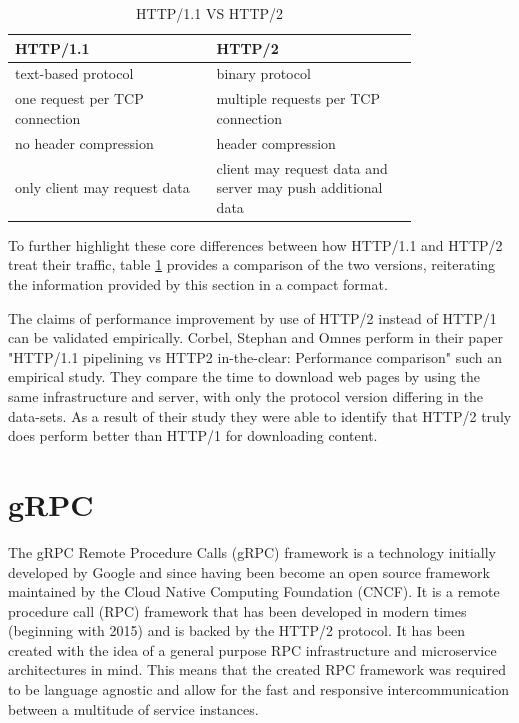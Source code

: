 \documentclass[conference]{IEEEtran}
\begin{document}
\begin{table}[!htbp]
	\centering
	\caption{HTTP/1.1 VS HTTP/2}
	\label{http2comparison}
	\begin{tabular}{| p{0.4\linewidth} | p{0.4\linewidth}|}\hline
		HTTP/1.1 & HTTP/2 \\\hline
		text-based protocol & binary protocol \\\hline
		one request per TCP connection & multiple requests per TCP connection \\\hline
		no header compression & header compression \\\hline
		only client may request data & client may request data and server may push additional data \\\hline
	\end{tabular}
\end{table}

To further highlight these core differences between how HTTP/1.1 and HTTP/2 treat their traffic, table \ref{http2comparison} provides a comparison of the two versions, reiterating the information provided by this section in a compact format.

The claims of performance improvement by use of HTTP/2 instead of HTTP/1 can be validated empirically. Corbel, Stephan and Omnes perform in their paper "HTTP/1.1 pipelining vs HTTP2 in-the-clear: Performance comparison" \cite{7745823} such an empirical study. They compare the time to download web pages by using the same infrastructure and server, with only the protocol version differing in the data-sets. As a result of their study they were able to identify that HTTP/2 truly does perform better than HTTP/1 for downloading content.

\section{gRPC}
\label{sec:grpc}

The gRPC Remote Procedure Calls (gRPC) framework \cite{GRPCAuthors2020} is a technology initially developed by Google and since having been become an open source framework maintained by the Cloud Native Computing Foundation (CNCF). It is a remote procedure call (RPC) framework that has been developed in modern times (beginning with 2015) and is backed by the HTTP/2 protocol. It has been created with the idea of a general purpose RPC infrastructure and microservice architectures in mind. This means that the created RPC framework was required to be language agnostic and allow for the fast and responsive intercommunication between a multitude of service instances.
\end{document}
